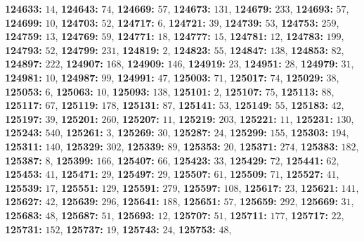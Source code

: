 \textsf{\bfseries 124633:} $14$, \textsf{\bfseries 124643:} $74$, \textsf{\bfseries 124669:} $57$, \textsf{\bfseries 124673:} $131$, \textsf{\bfseries 124679:} $233$, \textsf{\bfseries 124693:} $57$, \textsf{\bfseries 124699:} $10$, \textsf{\bfseries 124703:} $52$, \textsf{\bfseries 124717:} $6$, \textsf{\bfseries 124721:} $39$, \textsf{\bfseries 124739:} $53$, \textsf{\bfseries 124753:} $259$, \textsf{\bfseries 124759:} $13$, \textsf{\bfseries 124769:} $59$, \textsf{\bfseries 124771:} $18$, \textsf{\bfseries 124777:} $15$, \textsf{\bfseries 124781:} $12$, \textsf{\bfseries 124783:} $199$, \textsf{\bfseries 124793:} $52$, \textsf{\bfseries 124799:} $231$, \textsf{\bfseries 124819:} $2$, \textsf{\bfseries 124823:} $55$, \textsf{\bfseries 124847:} $138$, \textsf{\bfseries 124853:} $82$, \textsf{\bfseries 124897:} $222$, \textsf{\bfseries 124907:} $168$, \textsf{\bfseries 124909:} $146$, \textsf{\bfseries 124919:} $23$, \textsf{\bfseries 124951:} $28$, \textsf{\bfseries 124979:} $31$, \textsf{\bfseries 124981:} $10$, \textsf{\bfseries 124987:} $99$, \textsf{\bfseries 124991:} $47$, \textsf{\bfseries 125003:} $71$, \textsf{\bfseries 125017:} $74$, \textsf{\bfseries 125029:} $38$, \textsf{\bfseries 125053:} $6$, \textsf{\bfseries 125063:} $10$, \textsf{\bfseries 125093:} $138$, \textsf{\bfseries 125101:} $2$, \textsf{\bfseries 125107:} $75$, \textsf{\bfseries 125113:} $88$, \textsf{\bfseries 125117:} $67$, \textsf{\bfseries 125119:} $178$, \textsf{\bfseries 125131:} $87$, \textsf{\bfseries 125141:} $53$, \textsf{\bfseries 125149:} $55$, \textsf{\bfseries 125183:} $42$, \textsf{\bfseries 125197:} $39$, \textsf{\bfseries 125201:} $260$, \textsf{\bfseries 125207:} $11$, \textsf{\bfseries 125219:} $203$, \textsf{\bfseries 125221:} $11$, \textsf{\bfseries 125231:} $130$, \textsf{\bfseries 125243:} $540$, \textsf{\bfseries 125261:} $3$, \textsf{\bfseries 125269:} $30$, \textsf{\bfseries 125287:} $24$, \textsf{\bfseries 125299:} $155$, \textsf{\bfseries 125303:} $194$, \textsf{\bfseries 125311:} $140$, \textsf{\bfseries 125329:} $302$, \textsf{\bfseries 125339:} $89$, \textsf{\bfseries 125353:} $20$, \textsf{\bfseries 125371:} $274$, \textsf{\bfseries 125383:} $182$, \textsf{\bfseries 125387:} $8$, \textsf{\bfseries 125399:} $166$, \textsf{\bfseries 125407:} $66$, \textsf{\bfseries 125423:} $33$, \textsf{\bfseries 125429:} $72$, \textsf{\bfseries 125441:} $62$, \textsf{\bfseries 125453:} $41$, \textsf{\bfseries 125471:} $29$, \textsf{\bfseries 125497:} $29$, \textsf{\bfseries 125507:} $61$, \textsf{\bfseries 125509:} $71$, \textsf{\bfseries 125527:} $41$, \textsf{\bfseries 125539:} $17$, \textsf{\bfseries 125551:} $129$, \textsf{\bfseries 125591:} $279$, \textsf{\bfseries 125597:} $108$, \textsf{\bfseries 125617:} $23$, \textsf{\bfseries 125621:} $141$, \textsf{\bfseries 125627:} $42$, \textsf{\bfseries 125639:} $296$, \textsf{\bfseries 125641:} $188$, \textsf{\bfseries 125651:} $57$, \textsf{\bfseries 125659:} $292$, \textsf{\bfseries 125669:} $31$, \textsf{\bfseries 125683:} $48$, \textsf{\bfseries 125687:} $51$, \textsf{\bfseries 125693:} $12$, \textsf{\bfseries 125707:} $51$, \textsf{\bfseries 125711:} $177$, \textsf{\bfseries 125717:} $22$, \textsf{\bfseries 125731:} $152$, \textsf{\bfseries 125737:} $19$, \textsf{\bfseries 125743:} $24$, \textsf{\bfseries 125753:} $48$, 
